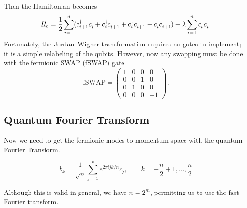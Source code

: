 \documentclass[12pt]{article}
\newcommand*{\eu}{e}
\newcommand*{\iu}{i}
\begin{document}
  Then the Hamiltonian becomes
  \begin{equation}
    \label{eq:hamiltonian-fermion}
    H_{c}
      = \frac{1}{2}
        \sum_{i = 1}^{n} (c_{i + 1}^{\dagger} c_{i}^{\vphantom{\dagger}}
                          + c_{i}^{\dagger} c_{i + 1}^{\vphantom{\dagger}}
                          + c_{i}^{\dagger} c_{i + 1}^{\dagger}
                          + c_{i}^{\vphantom{\dagger}}
                            c_{i + 1}^{\vphantom{\dagger}})
        + \lambda \sum_{i = 1}^{n} c_{i}^{\dagger} c_{i}^{\vphantom{\dagger}}.
  \end{equation}
  Fortunately, the Jordan--Wigner transformation requires no gates to implement; it is a simple relabeling of the qubits. However, now any swapping must be done with the fermionic SWAP (fSWAP) gate
  \begin{equation}
    \label{eq:fswap}
    \mathrm{fSWAP}
      = \begin{pmatrix}
          1 & 0 & 0 & 0 \\
          0 & 0 & 1 & 0 \\
          0 & 1 & 0 & 0 \\
          0 & 0 & 0 & -1
        \end{pmatrix}.
  \end{equation}

  \subsection{Quantum Fourier Transform}
  Now we need to get the fermionic modes to momentum space with the quantum Fourier Transform.

  \begin{equation}
    \label{eq:qft}
    b_{k}
      = \frac{1}{\sqrt{n}}
        \sum_{j = 1}^{n} \eu^{2 \pi \iu j k / n} c_{j}, \qquad
    k = -\frac{n}{2} + 1, \dotsc, \frac{n}{2}
  \end{equation}

  Although this is valid in general, we have \( n = 2^{m} \), permitting us to use the fast Fourier transform.
\end{document}
